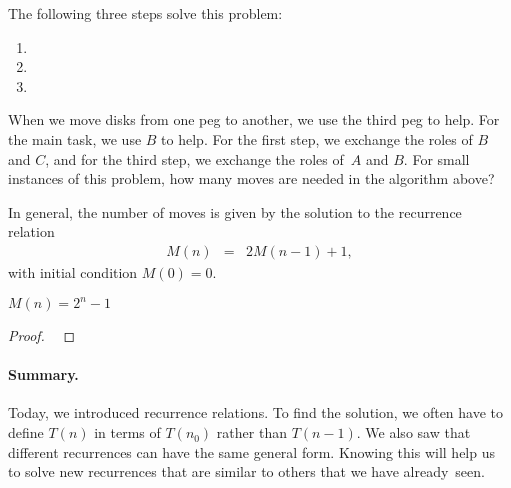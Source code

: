 \pagebreak
The following three steps solve this problem:
\begin{enumerate}
    \item %
    \item %
    \item %
\end{enumerate}
When we move disks from one peg to another, we use the third
peg to help.
For the main task, we use $B$ to help.
For the first step, we exchange the roles of $B$ and $C$,
and for the third step, we exchange the roles of~$A$ and $B$.
For small instances of this problem, how many moves are needed in the algorithm
above?
\practice

In general, the number of moves is given by the solution to the
recurrence relation
\begin{eqnarray*}
    M(n)  &=&  2 M(n-1) + 1 ,
\end{eqnarray*}
with initial condition $M(0)=0$.

\begin{lemma}
    $M(n)=2^n-1$
\end{lemma}
\begin{proof}
    ~\practice
\end{proof}

\paragraph{Summary.}
Today, we introduced recurrence relations.
To find the solution, we often have to define $T(n)$
in terms of $T(n_0)$ rather than $T(n-1)$.
We also saw that different recurrences can have
the same general form.
Knowing this will help us to solve
new recurrences that are similar to others
that we have already~seen.
